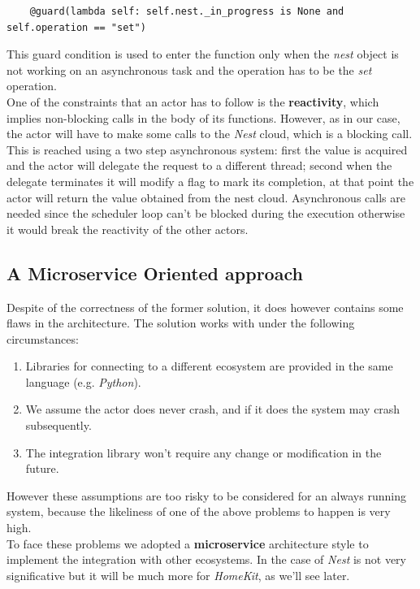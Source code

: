 \begin{verbatim}
    @guard(lambda self: self.nest._in_progress is None and self.operation == "set")
\end{verbatim}
This guard condition is used to enter the function only when the \textit{nest} object is not
working on an asynchronous task and the operation has to be the \textit{set} operation.\\
One of the constraints that an actor has to follow is the \textbf{reactivity}, which implies
non-blocking calls in the body of its functions. However, as in our case, the actor will have to
make some calls to the \textit{Nest} cloud, which is a blocking call. This is reached
using a two step asynchronous system: first the value is acquired and the actor
will delegate the request to a different thread; second when the delegate terminates it will
modify a flag to mark its completion, at that point the actor will return the value obtained
from the nest cloud. Asynchronous calls are needed since the scheduler loop can't be blocked
during the execution otherwise it would break the reactivity of the other actors.

\subsection{A Microservice Oriented approach}

Despite of the correctness of the former solution, it does however contains some
flaws in the architecture. The solution works with under the following circumstances:

\begin{enumerate}
    \item Libraries for connecting to a different ecosystem are provided in the same language (e.g. \textit{Python}).
    \item We assume the actor does never crash, and if it does the system may crash subsequently.
    \item The integration library won't require any change or modification in the future.
\end{enumerate}

However these assumptions are too risky to be considered for an always running system, because the likeliness
of one of the above problems to happen is very high.\\
To face these problems we adopted a \textbf{microservice} architecture style to implement the integration with
other ecosystems. In the case of \textit{Nest} is not very significative but it will be much more for \textit{HomeKit}, as
we'll see later.

